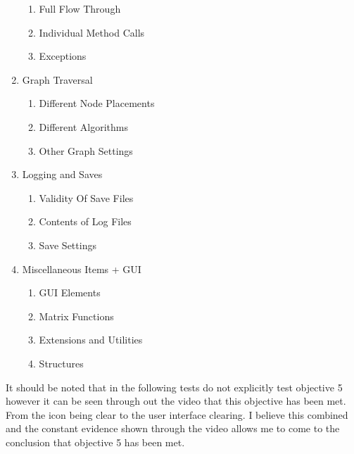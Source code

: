 \begin{FlushLeft}
\begin{enumerate}
\begin{enumerate}
            \item Full Flow Through
            \item Individual Method Calls
            \item Exceptions
        \end{enumerate}\bk
        \item Graph Traversal
        \begin{enumerate}
            \item Different Node Placements
            \item Different Algorithms
            \item Other Graph Settings
        \end{enumerate}\bk
        \item Logging and Saves
        \begin{enumerate}
            \item Validity Of Save Files
            \item Contents of Log Files
            \item Save Settings
        \end{enumerate}\bk
        \item Miscellaneous Items + GUI
        \begin{enumerate}
            \item GUI Elements
            \item Matrix Functions
            \item Extensions and Utilities 
            \item Structures
        \end{enumerate}
    \end{enumerate}
    \bk

    It should be noted that in the following tests do not explicitly test objective 5 however it can be seen through out the video that this objective has been met. From the icon being clear to the user interface clearing. I believe this combined and the constant evidence shown through the video allows me to come to the conclusion that objective 5 has been met.
    

    \bk
    \setlength\LTpre{0pt}


\end{FlushLeft}
